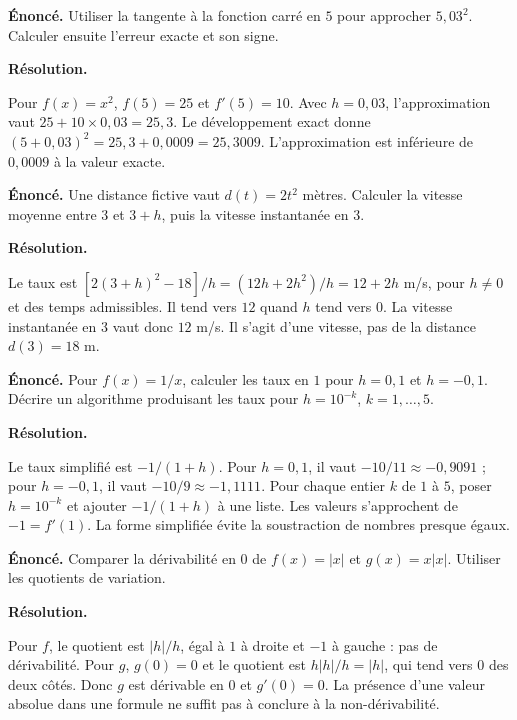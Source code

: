 \documentclass[11pt,a4paper]{article}
\begin{document}
\par\noindent\begin{minipage}{\linewidth}
{\small\color{Muted}\textbf{Énoncé.} Utiliser la tangente à la fonction carré en $5$ pour approcher $5,03^2$. Calculer ensuite l’erreur exacte et son signe.}
\par\medskip
\textbf{Résolution.}\par
Pour $f(x)=x^2$, $f(5)=25$ et $f\prime(5)=10$. Avec $h=0,03$, l’approximation vaut $25+10\times0,03=25,3$. Le développement exact donne $(5+0,03)^2=25,3+0,0009=25,3009$. L’approximation est inférieure de $0,0009$ à la valeur exacte.
\end{minipage}\par
\par\noindent\begin{minipage}{\linewidth}
{\small\color{Muted}\textbf{Énoncé.} Une distance fictive vaut $d(t)=2t^2$ mètres. Calculer la vitesse moyenne entre $3$ et $3+h$, puis la vitesse instantanée en $3$.}
\par\medskip
\textbf{Résolution.}\par
Le taux est $[2(3+h)^2-18]/h=(12h+2h^2)/h=12+2h$ m/s, pour $h\ne0$ et des temps admissibles. Il tend vers $12$ quand $h$ tend vers $0$. La vitesse instantanée en $3$ vaut donc $12$ m/s. Il s’agit d’une vitesse, pas de la distance $d(3)=18$ m.
\end{minipage}\par
\par\noindent\begin{minipage}{\linewidth}
{\small\color{Muted}\textbf{Énoncé.} Pour $f(x)=1/x$, calculer les taux en $1$ pour $h=0,1$ et $h=-0,1$. Décrire un algorithme produisant les taux pour $h=10^{-k}$, $k=1,\ldots,5$.}
\par\medskip
\textbf{Résolution.}\par
Le taux simplifié est $-1/(1+h)$. Pour $h=0,1$, il vaut $-10/11\approx-0,9091$ ; pour $h=-0,1$, il vaut $-10/9\approx-1,1111$. Pour chaque entier $k$ de $1$ à $5$, poser $h=10^{-k}$ et ajouter $-1/(1+h)$ à une liste. Les valeurs s’approchent de $-1=f\prime(1)$. La forme simplifiée évite la soustraction de nombres presque égaux.
\end{minipage}\par
\par\noindent\begin{minipage}{\linewidth}
{\small\color{Muted}\textbf{Énoncé.} Comparer la dérivabilité en $0$ de $f(x)=|x|$ et $g(x)=x|x|$. Utiliser les quotients de variation.}
\par\medskip
\textbf{Résolution.}\par
Pour $f$, le quotient est $|h|/h$, égal à $1$ à droite et $-1$ à gauche : pas de dérivabilité. Pour $g$, $g(0)=0$ et le quotient est $h|h|/h=|h|$, qui tend vers $0$ des deux côtés. Donc $g$ est dérivable en $0$ et $g\prime(0)=0$. La présence d’une valeur absolue dans une formule ne suffit pas à conclure à la non-dérivabilité.
\end{minipage}\par
\end{document}
